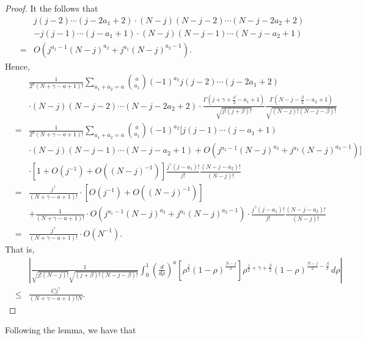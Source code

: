 \documentclass[12pt,reqno]{amsart}
\theoremstyle{plain}
\theoremstyle{remark}
\numberwithin{equation}{section}
\begin{document}
\begin{proof}
It the follows that
\begin{eqnarray*}
&&j(j-2)\cdots\left(j-2a_1+2\right)\cdot(N-j)(N-j-2)\cdots\left(N-j-2a_2+2\right)\\
&&-j(j-1)\cdots\left(j-a_1+1\right)\cdot(N-j)(N-j-1)\cdots\left(N-j-a_2+1\right)\\
&=&O\left(j^{a_1-1}(N-j)^{a_2}+j^{a_1}(N-j)^{a_2-1}\right).
\end{eqnarray*}
Hence,
\begin{eqnarray*}
&&\frac{1}{2^a(N+\gamma-a+1)!}\sum_{a_1+a_2=a}{a\choose a_1}(-1)^{a_2}j(j-2)\cdots\left(j-2a_1+2\right)\\
&&\cdot(N-j)(N-j-2)\cdots\left(N-j-2a_2+2\right)\cdot\frac{\Gamma\left(j+\gamma+\frac\beta2-a_1+1\right)}{\sqrt{j!(j+\beta)!}}\frac{\Gamma\left(N-j-\frac\beta2-a_2+1\right)}{\sqrt{(N-j)!(N-j-\beta)!}}\\
&=&\frac{1}{2^a(N+\gamma-a+1)!}\sum_{a_1+a_2=a}{a\choose a_1}(-1)^{a_2}\Big[j(j-1)\cdots\left(j-a_1+1\right)\\
&&\cdot(N-j)(N-j-1)\cdots\left(N-j-a_2+1\right)+O\left(j^{a_1-1}(N-j)^{a_2}+j^{a_1}(N-j)^{a_2-1}\right)\Big]\\&&\cdot\left[1+O\left(j^{-1}\right)+O\left((N-j)^{-1}\right)\right]\frac{j^\gamma\left(j-a_1\right)!}{j!}\frac{\left(N-j-a_2\right)!}{(N-j)!}\\
&=&\frac{j^\gamma}{(N+\gamma-a+1)!}\cdot\left[O\left(j^{-1}\right)+O\left((N-j)^{-1}\right)\right]\\
&&+\frac{1}{(N+\gamma-a+1)!}\cdot O\left(j^{a_1-1}(N-j)^{a_2}+j^{a_1}(N-j)^{a_2-1}\right)\cdot\frac{j^\gamma\left(j-a_1\right)!}{j!}\frac{\left(N-j-a_2\right)!}{(N-j)!}\\
&=&\frac{j^\gamma}{(N+\gamma-a+1)!}\cdot O\left(N^{-1}\right).
\end{eqnarray*}
That is,
\begin{eqnarray*}
&&\left|\frac{1}{\sqrt{j!(N-j)!}\sqrt{(j+\beta)!(N-j-\beta)!}}\int_0^1\left(\frac{d}{d\rho}\right)^a\left[\rho^\frac j2(1-\rho)^{\frac{N-j}{2}}\right]\rho^{\frac j2+\gamma+\frac\beta2}(1-\rho)^{\frac{N-j}{2}-\frac\beta2}\,d\rho\right|\\
&\le&\frac{Cj^\gamma}{(N+\gamma-a+1)!N}.
\end{eqnarray*}
\end{proof}
Following the lemma, we have that
\end{document}
